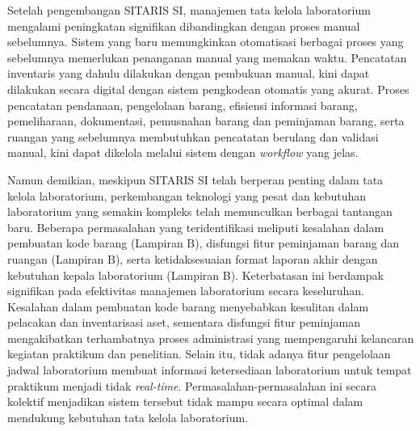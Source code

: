 Setelah pengembangan SITARIS SI, manajemen tata kelola laboratorium mengalami peningkatan signifikan dibandingkan dengan proses manual sebelumnya. Sistem yang baru memungkinkan otomatisasi berbagai proses yang sebelumnya memerlukan penanganan manual yang memakan waktu. Pencatatan inventaris yang dahulu dilakukan dengan pembukuan manual, kini dapat dilakukan secara digital dengan sistem pengkodean otomatis yang akurat. Proses pencatatan pendanaan, pengelolaan barang, efisiensi informasi barang, pemeliharaan, dokumentasi, pemusnahan barang dan peminjaman barang, serta ruangan yang sebelumnya membutuhkan pencatatan berulang dan validasi manual, kini dapat dikelola melalui sistem dengan \textit{workflow} yang jelas.

Namun demikian, meskipun SITARIS SI telah berperan penting dalam tata kelola laboratorium, perkembangan teknologi yang pesat dan kebutuhan laboratorium yang semakin kompleks telah memunculkan berbagai tantangan baru. Beberapa permasalahan yang teridentifikasi meliputi kesalahan dalam pembuatan kode barang (Lampiran B), disfungsi fitur peminjaman barang dan ruangan (Lampiran B), serta ketidaksesuaian format laporan akhir dengan kebutuhan kepala laboratorium (Lampiran B). Keterbatasan ini berdampak signifikan pada efektivitas manajemen laboratorium secara keseluruhan. Kesalahan dalam pembuatan kode barang menyebabkan kesulitan dalam pelacakan dan inventarisasi aset, sementara disfungsi fitur peminjaman mengakibatkan terhambatnya proses administrasi yang mempengaruhi kelancaran kegiatan praktikum dan penelitian. Selain itu, tidak adanya fitur pengelolaan jadwal laboratorium membuat informasi ketersediaan laboratorium untuk tempat praktikum menjadi tidak \textit{real-time}. Permasalahan-permasalahan ini secara kolektif menjadikan sistem tersebut tidak mampu secara optimal dalam mendukung kebutuhan tata kelola laboratorium.

